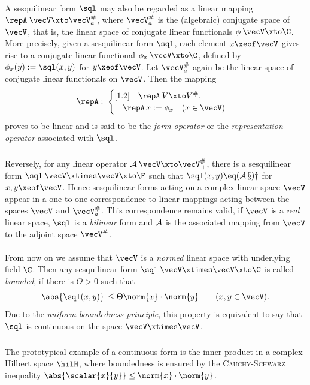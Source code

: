 \documentclass[11pt,twoside]{article}
\begin{document}
\paragraph{} %
A sesquilinear form $\sql$ may also be regarded
as a linear mapping $\repA\:\vecV \xto \vecV_a^{\#}$,
where $\vecV_a^{\#}$ is the (algebraic) conjugate space of $\vecV$,
that is,
the linear space of conjugate linear functionals $\phi\:\vecV \xto \C$.
More precisely,
given a sesquilinear form $\sql$,
each element $x \xeof \vecV$ gives rise to a conjugate linear functional
$\phi_x\:\vecV \xto \C$,
defined by $\phi_x(y) := \sql(x,y)$ for $y \xeof \vecV$.
Let $\vecV_a^{\#}$ again be the linear space
of conjugate linear functionals on $\vecV$.
Then the mapping
\[
\repA: \;
\begin{cases}[1.2]
\quad \repA\:V \xto V^{\#},\\
\quad \repA \, x := \phi_x \quad (x \in \vecV)
\end{cases}
\]
proves to be linear and is said to be the \textit{form operator}
or the \textit{representation operator} associated with $\sql$.

\subparagraph{}
Reversely,
for any linear operator $\cal{A}\:\vecV \xto \vecV_a^{\#}$,
there is a sesqui\-linear form $\sql\:\vecV \xtimes \vecV \xto \F$
such that $\sql(x,y) \eq (\cal{A} \, x) y$ for $x,y \xeof \vecV$.
Hence sesquilinear forms acting on a complex linear space $\vecV$
appear in a one-to-one correspondence to linear mappings
acting between the spaces $\vecV$ and $\vecV_a^{\#}$.
This correspondence remains valid,
if $\vecV$ is a \textit{real} linear space,
$\sql$ is a \textit{bilinear} form
and $\cal{A}$ is the associated mapping
from $\vecV$ to the adjoint space $\vecV^{\#}$.

\paragraph{} %
From now on we assume that $\vecV$ is a \textit{normed} linear space
with underlying field $\C$.
Then any sesquilinear form $\sql\:\vecV \xtimes \vecV \xto \C$
is called \textit{bounded},
if there is $\Theta > 0$ such that
\[
\abs{\sql(x,y)} \, \leq \Theta \norm{x} \cdot \norm{y}
\quad \quad (x,y \in \vecV).
\]
Due to the \textit{uniform boundedness principle},
this property is equivalent to say
that $\sql$ is continuous on the space $\vecV \xtimes \vecV$.

\subparagraph{} %
The prototypical example of a continuous form is
the inner product in a complex Hilbert space $\hilH$,
where boundedness is ensured by the \textsc{Cauchy-Schwarz} inequality
$\abs{ \scalar{x}{y} } \leq \norm{x} \cdot \norm{y}$.
\end{document}
